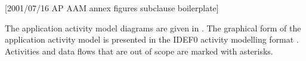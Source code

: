 [2001/07/16 AP AAM annex figures subclause boilerplate]

  The application activity model diagrams are given in \aamfigrs. The
graphical form of the application activity model is
presented in the IDEF0 activity modelling format \brefidefo.
Activities and data flows that are out of scope are
marked with asterisks.

\endinput
